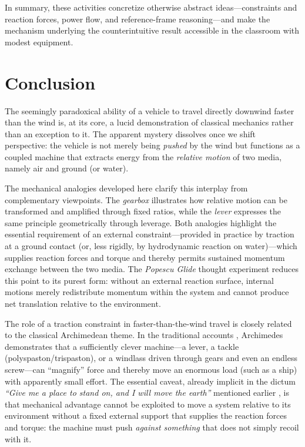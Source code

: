 \documentclass[a4paper]{article}
\begin{document}
In summary, these activities concretize otherwise abstract ideas---constraints
and reaction forces, power flow, and reference-frame reasoning---and make the
mechanism underlying the counterintuitive result accessible in the classroom
with modest equipment.

\section{Conclusion}

The seemingly paradoxical ability of a vehicle to travel directly downwind
faster than the wind is, at its core, a lucid demonstration of classical
mechanics rather than an exception to it. The apparent mystery dissolves once
we shift perspective: the vehicle is not merely being \emph{pushed} by the wind
but functions as a coupled machine that extracts energy from the \emph{relative
motion} of two media, namely air and ground (or water).

The mechanical analogies developed here clarify this interplay from
complementary viewpoints. The \emph{gearbox} illustrates how relative motion can
be transformed and amplified through fixed ratios, while the \emph{lever}
expresses the same principle geometrically through leverage. Both analogies
highlight the essential requirement of an external constraint---provided in
practice by traction at a ground contact (or, less rigidly, by hydrodynamic
reaction on water)---which supplies reaction forces and torque and thereby
permits sustained momentum exchange between the two media. The \emph{Popescu
Glide} thought experiment reduces this point to its purest form: without an
external reaction surface, internal motions merely redistribute momentum within
the system and cannot produce net translation relative to the environment.


The role of a traction constraint in faster-than-the-wind travel is closely
related to the classical Archimedean theme. In the traditional accounts
\cite[pp.~14--17]{dijksterhuis_archimedes_2014}, Archimedes demonstrates that a
sufficiently clever machine---a lever, a tackle (polyspaston/trispaston), or a
windlass driven through gears and even an endless screw---can ``magnify''
force and thereby move an enormous load (such as a ship) with apparently small
effort. The essential caveat, already implicit in the dictum
\emph{``Give me a place to stand on, and I will move the earth''} mentioned earlier
\cite[p.~15]{dijksterhuis_archimedes_2014}, is that mechanical advantage cannot
be exploited to move a system relative to its environment without a fixed
external support that supplies the reaction forces and torque: the machine must
push \emph{against something} that does not simply recoil with it.
\end{document}
